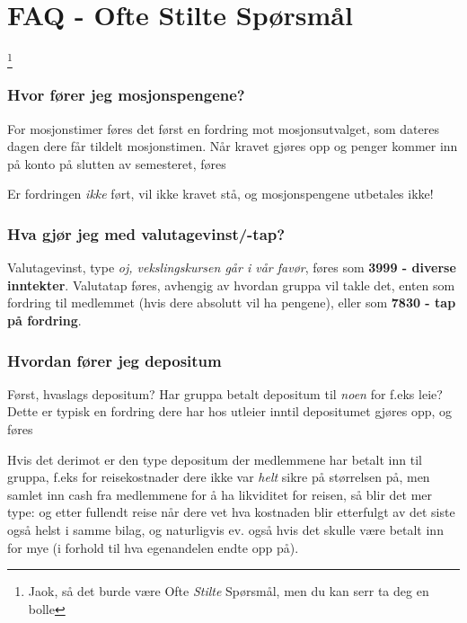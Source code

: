 \section{FAQ - Ofte Stilte Spørsmål}
\let\thefootnote\relax\footnote{Jaok, så det burde være Ofte \emph{Stilte} Spørsmål, men du kan serr ta deg en bolle}

\subsubsection*{Hvor fører jeg mosjonspengene?}
For mosjonstimer føres det først en fordring mot mosjonsutvalget, som dateres dagen dere får tildelt mosjonstimen.
Når kravet gjøres opp og penger kommer inn på konto på slutten av semesteret, føres

Er fordringen \emph{ikke} ført, vil ikke kravet stå, og mosjonspengene utbetales ikke!

\subsubsection*{Hva gjør jeg med valutagevinst/-tap?}
Valutagevinst, type \emph{oj, vekslingskursen går i vår favør}, føres som {\bfseries 3999 - diverse inntekter}. \newline
Valutatap føres, avhengig av hvordan gruppa vil takle det, enten som fordring til medlemmet (hvis dere absolutt vil ha pengene), eller som {\bfseries 7830 - tap på fordring}.

\subsubsection*{Hvordan fører jeg depositum}
Først, hvaslags depositum? Har gruppa betalt depositum til \emph{noen} for f.eks leie? Dette er typisk en fordring dere har hos utleier inntil depositumet gjøres opp, og føres 

Hvis det derimot er den type depositum der medlemmene har betalt inn til gruppa, f.eks for reisekostnader dere ikke var \emph{helt} sikre på størrelsen på, men samlet inn cash fra medlemmene for å ha likviditet for reisen, så blir det mer type:
og etter fullendt reise når dere vet hva kostnaden blir
etterfulgt av
det siste også helst i samme bilag, og naturligvis ev. også
hvis det skulle være betalt inn for mye (i forhold til hva egenandelen endte opp på).

